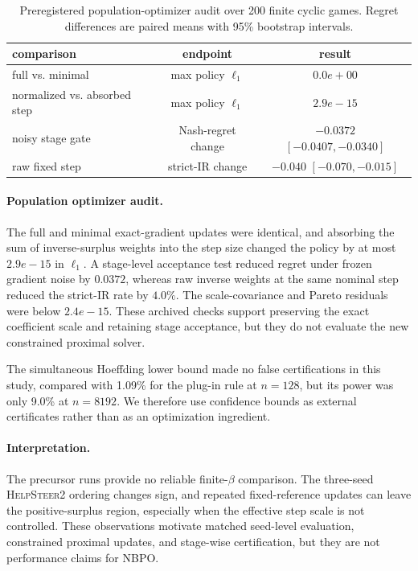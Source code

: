 \documentclass{article}
\theoremstyle{remark}
\theoremstyle{plain}
\newcommand{\NBPO}{\textsc{NBPO}}
\begin{document}
\begin{table}[t]
\centering\footnotesize
\caption{Preregistered population-optimizer audit over 200 finite cyclic games. Regret differences are paired means with 95\% bootstrap intervals.}
\label{tab:synthetic-simplification}
\begin{tabular}{lcc}
\toprule
comparison & endpoint & result \\
\midrule
full vs. minimal & max policy $\ell_1$ & $0.0e+00$ \\
normalized vs. absorbed step & max policy $\ell_1$ & $2.9e-15$ \\
noisy stage gate & Nash-regret change & $-0.0372$ $[-0.0407,-0.0340]$ \\
raw fixed step & strict-IR change & $-0.040$ $[-0.070,-0.015]$ \\
\bottomrule
\end{tabular}
\end{table}

\paragraph{Population optimizer audit.}
The full and minimal exact-gradient updates were identical, and absorbing the
sum of inverse-surplus weights into the step size changed the policy by at most
$2.9e-15$ in $\ell_1$. A stage-level acceptance test reduced regret under
frozen gradient noise by $0.0372$, whereas raw inverse weights at the same
nominal step reduced the strict-IR rate by $4.0\%$. The scale-covariance and
Pareto residuals were below $2.4e-15$. These archived checks support preserving
the exact coefficient scale and retaining stage acceptance, but they do not
evaluate the new constrained proximal solver.

The simultaneous Hoeffding lower bound made no false certifications in this
study, compared with 1.09\% for the plug-in
rule at $n=128$, but its power was only 9.0\% at
$n=8192$. We therefore use confidence bounds as external certificates rather
than as an optimization ingredient.

\paragraph{Interpretation.}
The precursor runs provide no reliable finite-$\beta$ comparison. The three-seed \textsc{HelpSteer2} ordering changes sign, and repeated fixed-reference updates can leave the positive-surplus region, especially when the effective step scale is not controlled. These observations motivate matched seed-level evaluation, constrained proximal updates, and stage-wise certification, but they are not performance claims for \NBPO{}.
\end{document}
